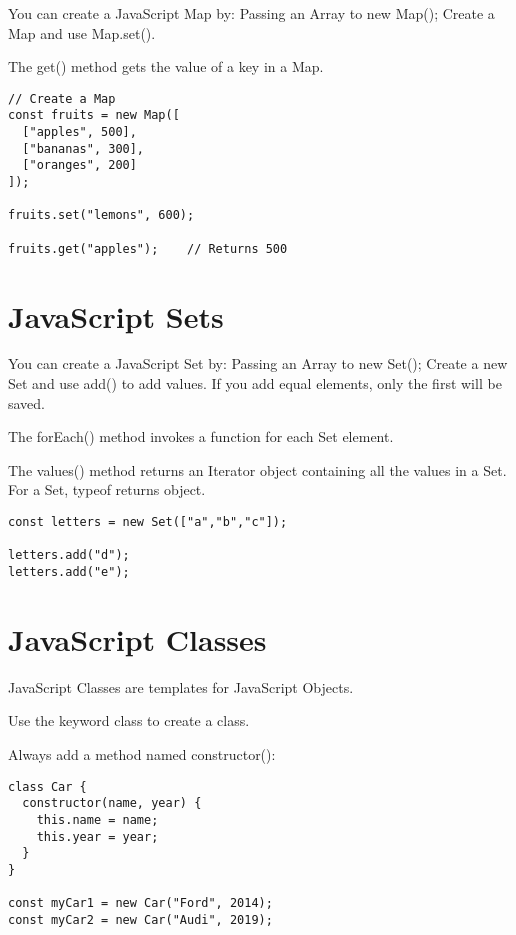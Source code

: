 \documentclass[a4paper,12pt]{article}
\begin{document}
\begin{large}
You can create a JavaScript Map by: Passing an Array to new Map();
Create a Map and use Map.set().

The get() method gets the value of a key in a Map.

\begin{lstlisting}
// Create a Map
const fruits = new Map([
  ["apples", 500],
  ["bananas", 300],
  ["oranges", 200]
]);

fruits.set("lemons", 600);

fruits.get("apples");    // Returns 500
\end{lstlisting}



\pagebreak

\section*{JavaScript Sets}

You can create a JavaScript Set by: Passing an Array to new Set(); Create a new Set and use add() to add values. If you add equal elements, only the first will be saved.

The forEach() method invokes a function for each Set element.

The values() method returns an Iterator object containing all the values in a Set. For a Set, typeof returns object.

\begin{lstlisting}
const letters = new Set(["a","b","c"]);

letters.add("d");
letters.add("e");

\end{lstlisting}






\section*{JavaScript Classes}

JavaScript Classes are templates for JavaScript Objects.

Use the keyword class to create a class.

Always add a method named constructor():

\begin{lstlisting}
class Car {
  constructor(name, year) {
    this.name = name;
    this.year = year;
  }
}

const myCar1 = new Car("Ford", 2014);
const myCar2 = new Car("Audi", 2019);
\end{lstlisting}







\end{large}
\end{document}

